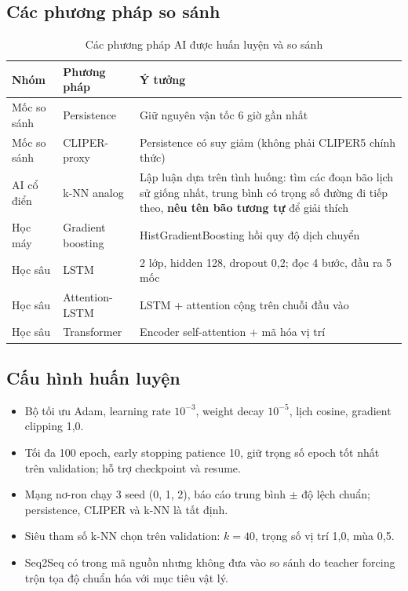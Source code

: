 \documentclass[12pt,a4paper]{article}
\begin{document}
\subsection{Các phương pháp so sánh}
\begin{table}[H]\centering\small
\begin{tabular}{l l p{8cm}}
\toprule
Nhóm & Phương pháp & Ý tưởng \\
\midrule
Mốc so sánh & Persistence & Giữ nguyên vận tốc 6 giờ gần nhất \\
Mốc so sánh & CLIPER-proxy & Persistence có suy giảm (không phải CLIPER5 chính thức) \\
AI cổ điển & k-NN analog & Lập luận dựa trên tình huống: tìm các đoạn bão lịch sử
giống nhất, trung bình có trọng số đường đi tiếp theo, \textbf{nêu tên bão tương tự} để giải thích \\
Học máy & Gradient boosting & HistGradientBoosting hồi quy độ dịch chuyển \\
Học sâu & LSTM & 2 lớp, hidden 128, dropout 0,2; đọc 4 bước, đầu ra 5 mốc \\
Học sâu & Attention-LSTM & LSTM + attention cộng trên chuỗi đầu vào \\
Học sâu & Transformer & Encoder self-attention + mã hóa vị trí \\
\bottomrule
\end{tabular}
\caption{Các phương pháp AI được huấn luyện và so sánh}
\end{table}

\subsection{Cấu hình huấn luyện}
\begin{itemize}
  \item Bộ tối ưu Adam, learning rate $10^{-3}$, weight decay $10^{-5}$,
        lịch cosine, gradient clipping 1,0.
  \item Tối đa 100 epoch, early stopping patience 10, giữ trọng số epoch tốt nhất
        trên validation; hỗ trợ checkpoint và resume.
  \item Mạng nơ-ron chạy 3 seed (0, 1, 2), báo cáo trung bình $\pm$ độ lệch chuẩn;
        persistence, CLIPER và k-NN là tất định.
  \item Siêu tham số k-NN chọn trên validation: $k=40$, trọng số vị trí 1,0, mùa 0,5.
  \item Seq2Seq có trong mã nguồn nhưng không đưa vào so sánh do teacher forcing
        trộn tọa độ chuẩn hóa với mục tiêu vật lý.
\end{itemize}
\end{document}
